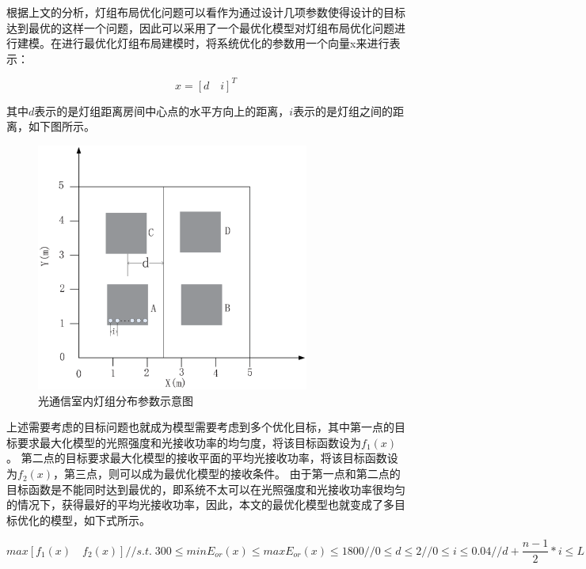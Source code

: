 根据上文的分析，灯组布局优化问题可以看作为通过设计几项参数使得设计的目标达到最优的这样一个问题，因此可以采用了一个最优化模型对灯组布局优化问题进行建模。在进行最优化灯组布局建模时，将系统优化的参数用一个向量x来进行表示：

\begin{equation}
    x=\left[d \quad i\right]^T
\end{equation}

其中$d$表示的是灯组距离房间中心点的水平方向上的距离，$i$表示的是灯组之间的距离，如下图所示。

\begin{figure}[htbp]
    \centering
	\includegraphics[width=0.8\textwidth]{figures/chapter-3/LedLayoutDI.eps}
	\caption{光通信室内灯组分布参数示意图}
	\label{fig:led-layout-d-i}
\end{figure}

上述需要考虑的目标问题也就成为模型需要考虑到多个优化目标，其中第一点的目标要求最大化模型的光照强度和光接收功率的均匀度，将该目标函数设为$f_{1}(x)$。
第二点的目标要求最大化模型的接收平面的平均光接收功率，将该目标函数设为$f_{2}(x)$，第三点，则可以成为最优化模型的接收条件。
由于第一点和第二点的目标函数是不能同时达到最优的，即系统不太可以在光照强度和光接收功率很均匀的情况下，获得最好的平均光接收功率，因此，本文的最优化模型也就变成了多目标优化的模型，如下式所示。

\begin{equation}
    max \left[f_{1}(x) \quad f_{2}(x)\right] //
    s.t.\; 300\le minE_{or}(x) \le maxE_{or}(x) \le 1800 //
           0 \le d \le 2   //
           0 \le i \le 0.04 //
           d+\frac{n-1}{2}*i \le L
\end{equation}

